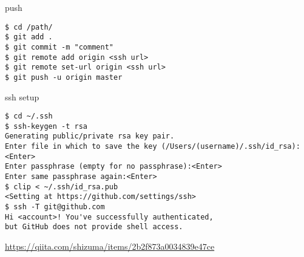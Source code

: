 \documentclass[dvipdfmx,twocolumn,b5paper,10.5pt]{jarticle}		%
\title{\gt \vspace{-5mm}}
\author{}
\date{}
\title{\textcolor{maincolor}{}}
\author{\textcolor{maincolor}{\vspace{0.7cm}}}
\date{\textcolor{maincolor}{}}
\begin{document}
	
\begin{frame}[fragile]{push}
\begin{verbatim}
$ cd /path/
$ git add .
$ git commit -m "comment"
$ git remote add origin <ssh url>
$ git remote set-url origin <ssh url>
$ git push -u origin master
\end{verbatim}
\end{frame}

\begin{frame}[fragile]{ssh setup}
\begin{verbatim}
$ cd ~/.ssh
$ ssh-keygen -t rsa
Generating public/private rsa key pair.
Enter file in which to save the key (/Users/(username)/.ssh/id_rsa):<Enter>
Enter passphrase (empty for no passphrase):<Enter>
Enter same passphrase again:<Enter>
$ clip < ~/.ssh/id_rsa.pub
<Setting at https://github.com/settings/ssh>
$ ssh -T git@github.com
Hi <account>! You've successfully authenticated, 
but GitHub does not provide shell access.
\end{verbatim}
\bigskip
\textcolor{maincolor}{\href{https://qiita.com/shizuma/items/2b2f873a0034839e47ce}{https://qiita.com/shizuma/items/2b2f873a0034839e47ce}}
\end{frame}
\end{document}
